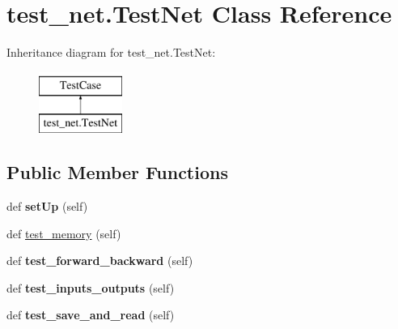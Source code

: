 \hypertarget{classtest__net_1_1_test_net}{}\section{test\+\_\+net.\+Test\+Net Class Reference}
\label{classtest__net_1_1_test_net}
Inheritance diagram for test\+\_\+net.\+Test\+Net\+:\begin{figure}[H]
\begin{center}
\leavevmode
\includegraphics[height=2.000000cm]{classtest__net_1_1_test_net}
\end{center}
\end{figure}
\subsection*{Public Member Functions}
\begin{DoxyCompactItemize}
\item 
\hypertarget{classtest__net_1_1_test_net_a864f6fa941b5e7f59b9eee6a676f9604}{}def {\bfseries set\+Up} (self)\label{classtest__net_1_1_test_net_a864f6fa941b5e7f59b9eee6a676f9604}

\item 
def \hyperlink{classtest__net_1_1_test_net_a124e87079f074a8333dd71e9742e6118}{test\+\_\+memory} (self)
\item 
\hypertarget{classtest__net_1_1_test_net_a193ec22a0394c6df9e8c0143c7768462}{}def {\bfseries test\+\_\+forward\+\_\+backward} (self)\label{classtest__net_1_1_test_net_a193ec22a0394c6df9e8c0143c7768462}

\item 
\hypertarget{classtest__net_1_1_test_net_a98366efc38e1ebc3346b33c73159624b}{}def {\bfseries test\+\_\+inputs\+\_\+outputs} (self)\label{classtest__net_1_1_test_net_a98366efc38e1ebc3346b33c73159624b}

\item 
\hypertarget{classtest__net_1_1_test_net_aa7d8ffffb4ba5827744bb22a79135fe7}{}def {\bfseries test\+\_\+save\+\_\+and\+\_\+read} (self)\label{classtest__net_1_1_test_net_aa7d8ffffb4ba5827744bb22a79135fe7}

\end{DoxyCompactItemize}
